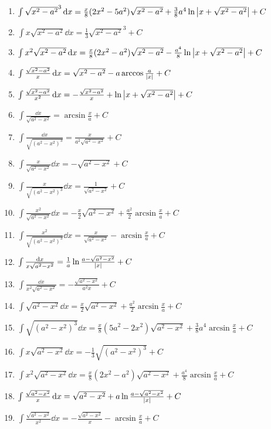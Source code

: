\begin{enumerate}
\item \(\int \sqrt{x^2-a^2}^3 \dd{x} = \frac{x}{8} (2x^2-5a^2) \sqrt{x^2-a^2} + \frac{3}{8} a^4 \ln\abs{x+\sqrt{x^2-a^2}} + C\)

\item \(\int x\sqrt{x^2-a^2} \dd{x} = \frac{1}{3} \sqrt{x^2-a^2}^3 + C\)

\item \(\int x^2 \sqrt{x^2-a^2} \dd{x} = \frac{x}{8} (2x^2-a^2) \sqrt{x^2-a^2} - \frac{a^4}{8} \ln\abs{x+\sqrt{x^2-a^2}} + C\)

\item \(\int \frac{\sqrt{x^2-a^2}}{x} \dd{x} = \sqrt{x^2-a^2} - a \arccos\frac{a}{\abs{x}} + C\)

\item \(\int \frac{\sqrt{x^2-a^2}}{x^2} \dd{x} = -\frac{\sqrt{x^2-a^2}}{x} + \ln\abs{x+\sqrt{x^2-a^2}} + C\)

\item \(\int \frac{\dd{x}}{\sqrt{a^2-x^2}} = \arcsin\frac{x}{a} + C\)
\item \(\int \frac{\dd{x}}{\sqrt{(a^2-x^2)^3}} = \frac{x}{a^2 \sqrt{a^2-x^2}} + C\)
\item \(\int \frac{x}{\sqrt{a^2-x^2}} \dd{x} = -\sqrt{a^2-x^2} + C\)
\item \(\int \frac{x}{\sqrt{(a^2-x^2)^3}} \dd{x} = \frac{1}{\sqrt{a^2-x^2}} + C\)
\item \(\int \frac{x^2}{\sqrt{a^2-x^2}} \dd{x} = -\frac{x}{2} \sqrt{a^2-x^2} + \frac{a^2}{2} \arcsin\frac{x}{a} + C\)
\item \(\int \frac{x^2}{\sqrt{(a^2-x^2)^3}} \dd{x} = \frac{x}{\sqrt{a^2-x^2}} - \arcsin\frac{x}{a} + C\)
\item \(\int \frac{\dd{x}}{x \sqrt{a^2-x^2}} = \frac{1}{a} \ln\frac{a-\sqrt{a^2-x^2}}{\abs{x}} + C\)
\item \(\int \frac{\dd{x}}{x^2 \sqrt{a^2-x^2}} = -\frac{\sqrt{a^2-x^2}}{a^2 x} + C\)
\item \(\int \sqrt{a^2-x^2} \dd{x} = \frac{x}{2} \sqrt{a^2-x^2} + \frac{a^2}{2} \arcsin\frac{x}{a} + C\)
\item \(\int \sqrt{(a^2-x^2)^3} \dd{x} = \frac{x}{8} (5a^2 - 2x^2) \sqrt{a^2-x^2} + \frac{3}{8} a^4 \arcsin\frac{x}{a} + C\)
\item \(\int x \sqrt{a^2-x^2} \dd{x} = -\frac{1}{3} \sqrt{(a^2-x^2)^3} + C\)
\item \(\int x^2 \sqrt{a^2-x^2} \dd{x} = \frac{x}{8} (2x^2 - a^2) \sqrt{a^2-x^2} + \frac{a^4}{8} \arcsin\frac{x}{a} + C\)
\item \(\int \frac{\sqrt{a^2-x^2}}{x} \dd{x} = \sqrt{a^2-x^2} + a \ln\frac{a-\sqrt{a^2-x^2}}{\abs{x}} + C\)
\item \(\int \frac{\sqrt{a^2-x^2}}{x^2} \dd{x} = -\frac{\sqrt{a^2-x^2}}{x} - \arcsin\frac{x}{a} + C\)


\end{enumerate}
